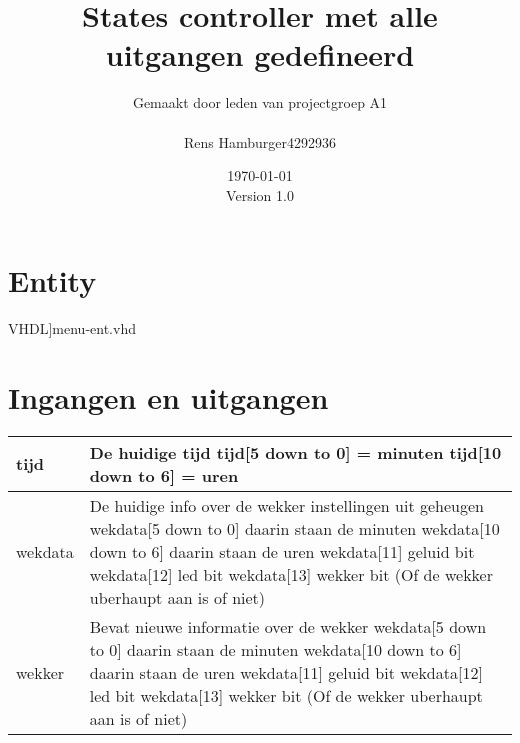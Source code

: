 \documentclass[a4paper, oneside, 10pt]{article}
\title{\textbf{States controller met alle uitgangen gedefineerd}}
\author{
Gemaakt door leden van projectgroep A1\\
\begin{tabular}{c | l}
Rens Hamburger & 4292936 \\
\end{tabular}
}
\date{\today\\ Version 1.0}
\begin{document}
\maketitle

\newpage
\section{Entity}
\scriptsize 
  VHDL]{menu-ent.vhd}
 \normalsize
\section{Ingangen en uitgangen}
\begin{tabular}{|l|p{10cm}|}
\hline
tijd & De huidige tijd \newline
tijd[5 down to 0] = minuten \newline
tijd[10 down to 6] = uren  \\ \hline
wekdata & De huidige info over de wekker instellingen uit geheugen \newline
wekdata[5 down to 0] daarin staan de minuten \newline
wekdata[10 down to 6] daarin staan de uren \newline
wekdata[11] geluid bit \newline
wekdata[12] led bit \newline
wekdata[13] wekker bit (Of de wekker uberhaupt aan is of niet) \\ \hline
wekker & Bevat nieuwe informatie over de wekker \newline
wekdata[5 down to 0] daarin staan de minuten \newline
wekdata[10 down to 6] daarin staan de uren \newline
wekdata[11] geluid bit \newline
wekdata[12] led bit \newline
wekdata[13] wekker bit (Of de wekker uberhaupt aan is of niet) \\ \hline
\end{tabular}
\end{document}
